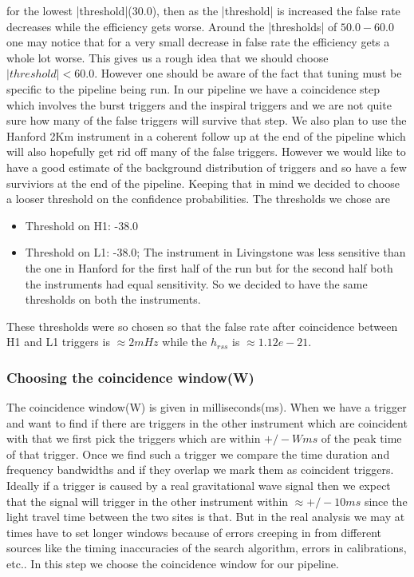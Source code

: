 for the lowest |threshold|(30.0),  then as the |threshold| is increased
the false rate decreases while the efficiency gets worse. Around the 
|thresholds| of $50.0 - 60.0$ one may notice that for a very small 
decrease in false rate the efficiency gets a whole lot worse.  This gives 
us a rough idea that we should choose $ |threshold| < 60.0$.  However
one should be aware of the fact that tuning must be specific to the 
pipeline being run.  In our pipeline we have a coincidence step which
involves the burst triggers and the inspiral triggers and we are not
quite sure how many of the false triggers will survive that step. We
also plan to use the Hanford 2Km instrument in a coherent follow up at
the end of the pipeline which will also hopefully get rid off many of the
false triggers. However we would like to  
have a good estimate of the background distribution of triggers and so 
have a few surviviors at the end of the pipeline.  Keeping that 
in mind we decided to choose a looser threshold on the confidence 
probabilities. The thresholds we chose are 
\begin{itemize}
\item Threshold on H1: -38.0
\item Threshold on L1: -38.0; The instrument in Livingstone was less 
sensitive than the one in Hanford for the first half of the run but 
for the second half both the instruments had equal sensitivity.  So
we decided to have the same thresholds on both the instruments.
\end{itemize}      
These thresholds were so chosen so that the false rate after 
coincidence between H1 and L1 triggers is $\approx 2 mHz$ while 
the $ h_{rss}$ is $\approx 1.12e-21$.

\subsubsection{Choosing the coincidence window(W)}
\label{section:tunewindow}
The coincidence window(W) is given in milliseconds(ms).  When we 
have a trigger and want to find if there are triggers in the 
other instrument which are 
coincident with that we first pick the triggers which are within
$+/- W ms$ of the peak time of that trigger.  Once we find such a 
trigger we compare the time duration and frequency bandwidths and
if they overlap we mark them as coincident triggers. Ideally if a trigger 
is caused by a real gravitational wave signal then we expect that the
signal will trigger in the other instrument within $\approx +/- 10 ms$
since the light travel time between the two sites is that. But in the 
real analysis we may at times have to set longer windows because of 
errors creeping in from different sources like the timing inaccuracies 
of the search algorithm, errors in calibrations, etc..  In this step 
we choose the coincidence window for our pipeline.


